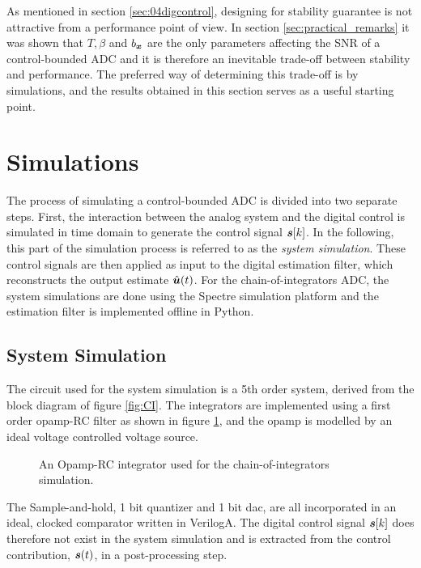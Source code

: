 As mentioned in section \ref{sec:04digcontrol}, designing for stability guarantee is not attractive from a performance point of view. In section \ref{sec:practical_remarks} it was shown that $T, \beta$ and $b_{\bm{x}}$ are the only parameters affecting the SNR of a control-bounded ADC and it is therefore an inevitable trade-off between stability and performance. The preferred way of determining this trade-off is by simulations, and the results obtained in this section serves as a useful starting point.















\section{Simulations}
The process of simulating a control-bounded ADC is divided into two separate steps. First, the interaction between the analog system and the digital control is simulated in time domain to generate the control signal $\bm{s}[k]$. In the following, this part of the simulation process is referred to as the \textit{system simulation}. These control signals are then applied as input to the digital estimation filter, which reconstructs the output estimate $\hat{\bm{u}}(t)$. For the chain-of-integrators ADC, the system simulations are done using the Spectre simulation platform \cite{spectre} and the estimation filter is implemented offline in Python.

\subsection{System Simulation}
The circuit used for the system simulation is a 5th order system, derived from the block diagram of figure \ref{fig:CI}. The integrators are implemented using a first order opamp-RC filter as shown in figure \ref{fig:opampRCint}, and the opamp is modelled by an ideal voltage controlled voltage source.
\begin{figure}[htbp]
    \centering
    
    \caption{An Opamp-RC integrator used for the chain-of-integrators simulation.}
    \label{fig:opampRCint}
\end{figure}
The Sample-and-hold, 1 bit quantizer and 1 bit dac, are all incorporated in an ideal, clocked comparator written in VerilogA. The digital control signal $\bm{s}[k]$ does therefore not exist in the system simulation and is extracted from the control contribution, $\bm{s}(t)$, in a post-processing step.

